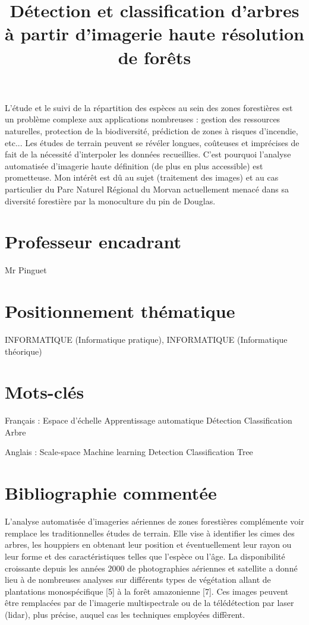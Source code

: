 \documentclass{article}
\title{Détection et classification d'arbres à partir d'imagerie haute résolution de forêts}
\begin{document}
\maketitle

L'étude et le suivi de la répartition des espèces au sein des zones forestières est un problème complexe aux applications nombreuses : gestion des ressources naturelles, protection de la biodiversité, prédiction de zones à risques d'incendie, etc... 
Les études de terrain peuvent se révéler longues, coûteuses et imprécises de fait de la nécessité d'interpoler les données recueillies. 
C'est pourquoi l'analyse automatisée d'imagerie haute définition (de plus en plus accessible) est prometteuse.
Mon intérêt est dû au sujet (traitement des images) et au cas particulier du Parc Naturel Régional du Morvan actuellement menacé dans sa diversité forestière par la monoculture du pin de Douglas.

\section{Professeur encadrant}
Mr Pinguet

\section{Positionnement thématique}
INFORMATIQUE (Informatique pratique), INFORMATIQUE (Informatique théorique)

\section{Mots-clés}
Français :
Espace d'échelle
Apprentissage automatique 
Détection
Classification 
Arbre

Anglais :
Scale-space
Machine learning
Detection
Classification
Tree

\section{Bibliographie commentée}

L'analyse automatisée d'imageries aériennes de zones forestières complémente voir remplace les traditionnelles études de terrain. Elle vise à identifier les cimes des arbres, les houppiers en obtenant leur position et éventuellement leur rayon ou leur forme et des caractéristiques telles que l'espèce ou l'âge. La disponibilité croissante depuis les années 2000 de photographies aériennes et satellite a donné lieu à de nombreuses analyses sur différents types de végétation allant de plantations monospécifique [5] à la forêt amazonienne [7]. Ces images peuvent être remplacées par de l'imagerie multispectrale ou de la télédétection par laser (lidar), plus précise, auquel cas les techniques employées diffèrent.
\end{document}
